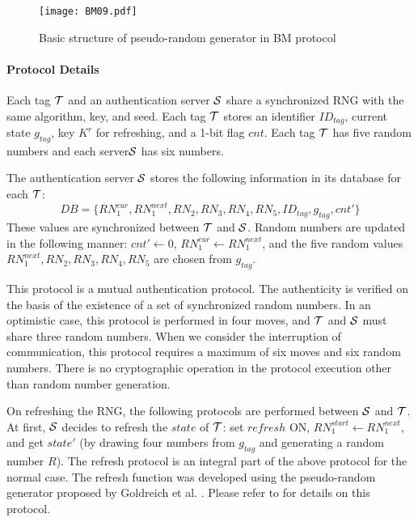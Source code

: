 \documentclass[english]{llncs}
\begin{document}


\begin{figure}
\begin{center}
\texttt{[image: BM09.pdf]}
\caption{Basic structure of pseudo-random generator in BM protocol}
\label{fig:BM09}
\end{center}
\end{figure}


\paragraph{Protocol Details}

Each tag ${\cal T}$ and an authentication server ${\cal S}$ share
a synchronized RNG with the same algorithm, key, and seed. Each tag
${\cal T}$ stores an identifier $ID_{tag}$, current state $g_{tag}$,
key $K^{r}$ for refreshing, and a 1-bit flag $cnt$. Each tag ${\cal T}$
has five random numbers and each server${\cal S}$ has six numbers.

The authentication server ${\cal S}$ stores the following information
in its database for each ${\cal T}$: \[
DB=\{RN_{1}^{cur},RN_{1}^{next},RN_{2},RN_{3},RN_{4},RN_{5},ID_{tag},g_{tag},cnt'\}\]
 These values are synchronized between ${\cal T}$ and ${\cal S}$.
Random numbers are updated in the following manner: $cnt'\leftarrow0$,
$RN_{1}^{cur}\leftarrow RN_{1}^{next}$, and the five random values
$RN_{1}^{next},RN_{2},RN_{3},RN_{4},RN_{5}$ are chosen from $g_{tag}$.

This protocol is a mutual authentication protocol. The authenticity
is verified on the basis of the existence of a set of synchronized
random numbers. In an optimistic case, this protocol is performed
in four moves, and ${\cal T}$ and ${\cal S}$ must share three random
numbers. When we consider the interruption of communication, this
protocol requires a maximum of six moves and six random numbers. There
is no cryptographic operation in the protocol execution other than
random number generation.

On refreshing the RNG, the following protocols are performed between
${\cal S}$ and ${\cal T}$.\\
At first, ${\cal S}$ decides to refresh the $state$ of ${\cal T}$:
set $refresh$ ON, $RN_{1}^{start}\leftarrow RN_{1}^{next}$, and
get $state'$ (by drawing four numbers from $g_{tag}$ and generating
a random number $R$). The refresh protocol is an integral part of
the above protocol for the normal case. The refresh function was developed
using the pseudo-random generator proposed by Goldreich et al. \cite{GGM86}.
Please refer to \cite{BM09} for details on this protocol.
\end{document}
